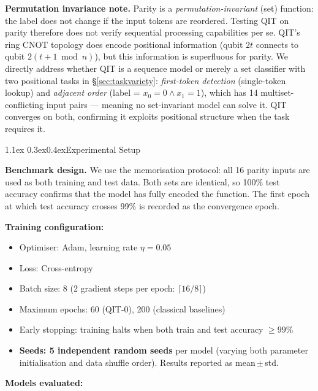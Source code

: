 \documentclass[11pt,a4paper]{article}
\makeatletter
\renewcommand\subsection{\@startsection{subsection}{2}{\z@}%
  {1.1ex \@plus 0.3ex}{0.4ex}{\normalfont\normalsize\bfseries}}
\makeatother
\begin{document}
\textbf{Permutation invariance note.} Parity is a \emph{permutation-invariant} (set)
function: the label does not change if the input tokens are reordered. Testing QIT on
parity therefore does not verify sequential processing capabilities per se. QIT's ring
CNOT topology does encode positional information (qubit $2t$ connects to qubit $2(t{+}1\bmod n)$),
but this information is superfluous for parity. We directly address whether QIT is a
sequence model or merely a set classifier with two positional tasks in
\S\ref{sec:taskvariety}: \emph{first-token detection} (single-token lookup) and
\emph{adjacent order} (label = $x_0{=}0 \wedge x_1{=}1$), which has 14 multiset-conflicting
input pairs --- meaning no set-invariant model can solve it. QIT converges on both,
confirming it exploits positional structure when the task requires it.

\subsection{Experimental Setup}

\textbf{Benchmark design.} We use the memorisation protocol: all 16 parity inputs are
used as both training and test data. Both sets are identical, so 100\% test accuracy
confirms that the model has fully encoded the function. The first epoch at which test
accuracy crosses 99\% is recorded as the convergence epoch.

\textbf{Training configuration:}
\begin{itemize}
  \item Optimiser: Adam, learning rate $\eta = 0.05$
  \item Loss: Cross-entropy
  \item Batch size: 8 (2 gradient steps per epoch: $\lceil 16/8 \rceil$)
  \item Maximum epochs: 60 (QIT-0), 200 (classical baselines)
  \item Early stopping: training halts when both train and test accuracy $\geq 99\%$
  \item \textbf{Seeds: 5 independent random seeds} per model (varying both parameter
        initialisation and data shuffle order). Results reported as mean\,$\pm$\,std.
\end{itemize}

\textbf{Models evaluated:}
\end{document}
